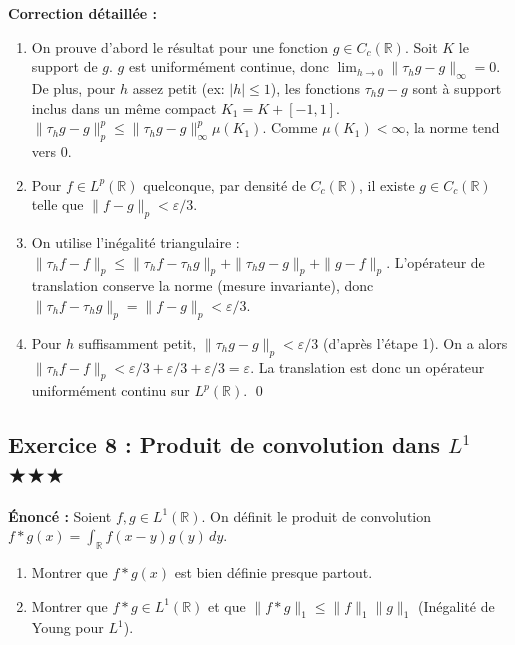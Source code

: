 \documentclass[11pt,a4paper]{article}
\begin{document}
\textbf{Correction détaillée :}
\begin{enumerate}
\item On prouve d'abord le résultat pour une fonction $g \in C_c(\mathbb{R})$.
   Soit $K$ le support de $g$. $g$ est uniformément continue, donc $\lim_{h \to 0} \| \tau_h g - g\|_\infty = 0$.
   De plus, pour $h$ assez petit (ex: $|h| \le 1$), les fonctions $\tau_h g - g$ sont à support inclus dans un même compact $K_1 = K + [-1, 1]$.
   $\|\tau_h g - g\|_p^p \le \|\tau_h g - g\|_\infty^p \mu(K_1)$. Comme $\mu(K_1) < \infty$, la norme tend vers 0.
\item Pour $f \in L^p(\mathbb{R})$ quelconque, par densité de $C_c(\mathbb{R})$, il existe $g \in C_c(\mathbb{R})$ telle que $\|f - g\|_p < \varepsilon/3$.
\item On utilise l'inégalité triangulaire :
   $\|\tau_h f - f\|_p \le \|\tau_h f - \tau_h g\|_p + \|\tau_h g - g\|_p + \|g - f\|_p$.
   L'opérateur de translation conserve la norme (mesure invariante), donc $\|\tau_h f - \tau_h g\|_p = \|f - g\|_p < \varepsilon/3$.
\item Pour $h$ suffisamment petit, $\|\tau_h g - g\|_p < \varepsilon/3$ (d'après l'étape 1).
   On a alors $\|\tau_h f - f\|_p < \varepsilon/3 + \varepsilon/3 + \varepsilon/3 = \varepsilon$.
   La translation est donc un opérateur uniformément continu sur $L^p(\mathbb{R})$. \qed
\end{enumerate}


\subsection*{Exercice 8 : Produit de convolution dans $L^1$ \quad $\bigstar\bigstar\bigstar$}
\textbf{Énoncé :}
Soient $f, g \in L^1(\mathbb{R})$. On définit le produit de convolution $f * g(x) = \int_{\mathbb{R}} f(x-y)g(y) \, dy$.
\begin{enumerate}
\item Montrer que $f * g(x)$ est bien définie presque partout.
\item Montrer que $f * g \in L^1(\mathbb{R})$ et que $\|f * g\|_1 \le \|f\|_1 \|g\|_1$ (Inégalité de Young pour $L^1$).
\end{enumerate}
\end{document}
